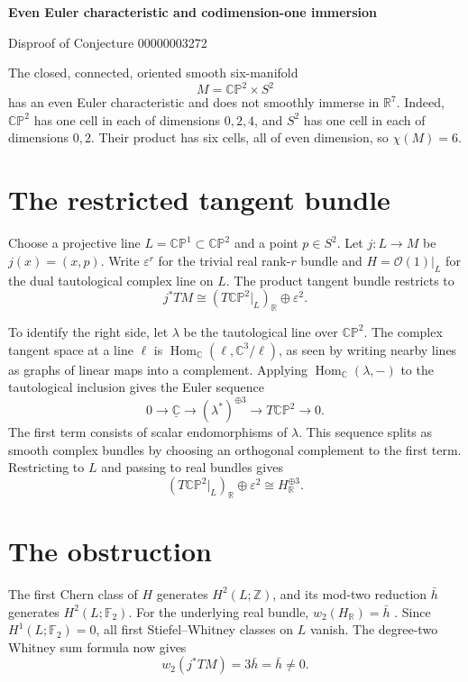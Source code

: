 \documentclass[10pt]{article}
\begin{document}
\begin{center}
  {\Large\bfseries Even Euler characteristic and codimension-one immersion\par}
  \smallskip
  Disproof of Conjecture 00000003272
\end{center}

The closed, connected, oriented smooth six-manifold
\[
  M=\mathbb{CP}^{2}\times S^2
\]
has an even Euler characteristic and does not smoothly immerse
in \(\mathbb R^7\). Indeed, \(\mathbb{CP}^2\) has one cell in each
of dimensions \(0,2,4\), and \(S^2\) has one cell in each of
dimensions \(0,2\). Their product has six cells, all of even
dimension, so \(\chi(M)=6\).

\section*{The restricted tangent bundle}

Choose a projective line \(L=\mathbb{CP}^{1}\subset\mathbb{CP}^{2}\)
and a point \(p\in S^2\). Let \(j:L\longrightarrow M\) be
\(j(x)=(x,p)\). Write \(\varepsilon^r\) for the trivial real
rank-\(r\) bundle and \(H=\mathcal O(1)|_L\) for the dual
tautological complex line on \(L\). The product tangent bundle
restricts to
\[
  j^*TM\cong (T\mathbb{CP}^{2}|_L)_{\mathbb R}\oplus\varepsilon^2.
\]

To identify the right side, let \(\lambda\) be the tautological line
over \(\mathbb{CP}^2\). The complex tangent space at a line \(\ell\) is
\(\operatorname{Hom}_{\mathbb C}(\ell,\mathbb C^3/\ell)\), as seen by
writing nearby lines as graphs of linear maps into a complement.
Applying \(\operatorname{Hom}_{\mathbb C}(\lambda,-)\) to the
tautological inclusion gives the Euler sequence
\[
  0\longrightarrow \underline{\mathbb C}
   \longrightarrow (\lambda^*)^{\oplus3}
   \longrightarrow T\mathbb{CP}^2
   \longrightarrow 0.
\]
The first term consists of scalar endomorphisms of \(\lambda\).
This sequence splits as smooth complex bundles by choosing an
orthogonal complement to the first term. Restricting to \(L\)
and passing to real bundles gives
\[
  (T\mathbb{CP}^2|_L)_{\mathbb R}\oplus\varepsilon^2
  \cong H_{\mathbb R}^{\oplus3}.
\]

\section*{The obstruction}

The first Chern class of \(H\) generates \(H^2(L;\mathbb Z)\), and
its mod-two reduction \(\bar h\) generates \(H^2(L;\mathbb F_2)\).
For the underlying real bundle, \(w_2(H_{\mathbb R})=\bar h\)
\cite[Theorems~3.1--3.2 and Proposition~3.8]{hatcher}. Since
\(H^1(L;\mathbb F_2)=0\), all first Stiefel--Whitney classes
on \(L\) vanish. The degree-two Whitney sum formula now gives
\[
  w_2(j^*TM)=3\bar h=\bar h\ne0.
\]
\end{document}
